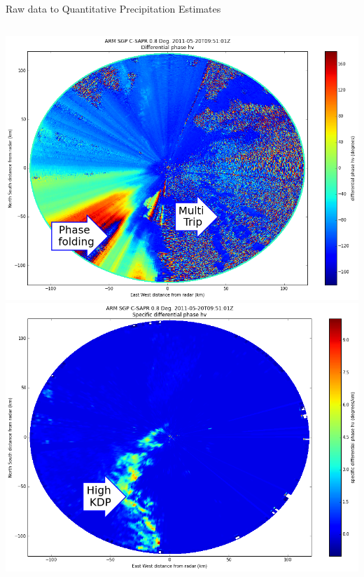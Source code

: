 \documentclass[final]{beamer}
\begin{document}
\begin{frame}{}
\begin{columns}[t]
\begin{column}{.3\linewidth}
\begin{block}{Raw data to Quantitative Precipitation Estimates}
\begin{columns}[t]
\begin{column}{.5\linewidth}
\begin{columns}[t]
\begin{column}{.5\linewidth}
                		\includegraphics[width=1.0\linewidth]{figures/phidp.png}\\[1ex] %
           		\includegraphics[width=1.0\linewidth]{figures/kdp.png}\\[1ex]    %

\end{column}
\end{columns}
\end{column}
\end{columns}
\end{block}
\end{column}
\end{columns}
\end{frame}
\end{document}
